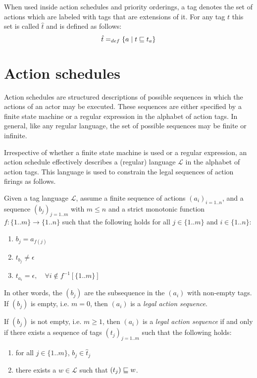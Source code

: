 When used inside action schedules and priority orderings, a tag denotes the
set of actions which are labeled with tags that are extensions of it.
For any tag $t$ this set is called $\hat t$ and is defined as follows:
\[ \hat t =_{def} \{a \mid t\sqsubseteq t_a\}  \]



\section{Action schedules}\label{sect:ActionSchedules}



Action schedules are structured
descriptions of possible sequences in which the actions of an actor
may be executed. These sequences are either specified by a finite
state machine or a regular expression in the alphabet of action tags.
In general, like any regular language, the set of possible sequences
may be finite or infinite.

Irrespective
of whether a finite state machine is used or a regular expression, an
action schedule effectively describes a (regular) language $\mathcal
L$ in the alphabet of action tags. This language is used to constrain
the legal sequences of action firings as follows.

\begin{defn}\label{def:LAS}
  Given a tag language $\mathcal L$, assume a finite sequence of
  actions $(a_i)_{i=1..n}$, and a sequence $(b_j)_{j=1..m}$ with
  $m\leq n$ and a strict monotonic function $f: \{1..m\}\longrightarrow\{1..n\}$
  such that the following holds for all $j\in \{1..m\}$ and $i\in
  \{1..n\}$:
  \begin{enumerate}
  \item $b_j = a_{f(j)}$
  \item $t_{b_j} \neq \epsilon$
  \item $t_{a_i} = \epsilon, \quad\forall i\not\in f^{-1}\left[\{1..m\}\right]$
  \end{enumerate}
  In other words, the $(b_j)$ are the subsequence in the $(a_i)$ with
  non-empty tags. If $(b_j)$ is empty, i.e. $m=0$, then $(a_i)$ is a {\em legal action
  sequence}.

  If $(b_j)$ is not empty, i.e. $m \geq 1$, then $(a_i)$ is a {\em legal action
    sequence} if and only if there exists a sequence of tags
  $(t_j)_{j=1..m}$ such that the following holds:
  \begin{enumerate}
  \item for all $j\in \{1..m\}$, $b_j \in \hat{t}_j$
  \item there exists a $w\in \mathcal L$ such that $(t_j) \sqsubseteq w$.
  \end{enumerate}
\end{defn}

